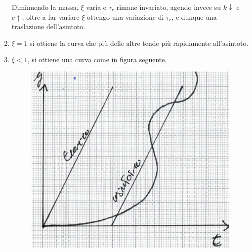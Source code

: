 \documentclass[a4paper, 15pt]{article}
\begin{document}
\begin{adjustwidth}{2in}{}
\begin{enumerate}[label=\Roman*.]
		Diminuendo la massa, $\xi$ varia e $\tau_r$ rimane invariato, agendo invece su $k\downarrow$ e $c\uparrow$, oltre a far variare $\xi$ ottengo una variazione di $\tau_r$, e dunque una traslazione dell'asintoto.
		\item \(\xi = 1\) si ottiene la curva che più delle altre tende più rapidamente all'asintoto.
		\item \(\xi < 1\), si ottiene una curva come in figura seguente. 		
\begin{figure}[H]
	\centering
	\includegraphics[width=0.3\linewidth]{fig/mm15}
	\label{fig:mm15}
\end{figure}
\end{enumerate}
\end{adjustwidth}
\newpage
\end{document}
